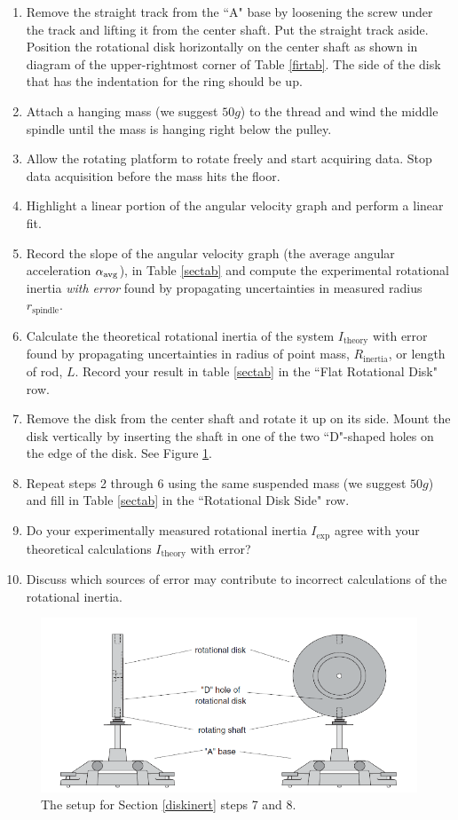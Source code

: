 \label{diskinert}
\begin{enumerate}
	\item Remove the straight track from the ``A" base by loosening the screw under the track and lifting it from the center shaft.  Put the straight track aside.  Position the rotational disk horizontally on the center shaft as shown in diagram of the upper-rightmost corner of Table \ref{firtab}.  The side of the disk that has the indentation for the ring should be up.
	\item Attach a hanging mass (we suggest $50g$) to the thread and wind the middle spindle until the mass is hanging right below the pulley.
	\item Allow the rotating platform to rotate freely and start acquiring data.  Stop data acquisition before the mass hits the floor.
	\item Highlight a linear portion of the angular velocity graph and perform a linear fit.
	\item Record the slope of the angular velocity graph (the average angular acceleration $\alpha _{\rm avg}$), in Table \ref{sectab} and compute the experimental rotational inertia {\it{with error}} found by propagating uncertainties in measured radius $r_\text{spindle}$.
\item Calculate the theoretical rotational inertia of the system $I_\text{theory}$ with error found by propagating uncertainties in radius of point mass, $R_\text{inertia}$, or length of rod, $L$. Record your result in table \ref{sectab} in the ``Flat Rotational Disk" row.
	\item Remove the disk from the center shaft and rotate it up on its side.  Mount the disk vertically by inserting the shaft in one of the two ``D"-shaped holes on the edge of the disk.  See Figure \ref{fig:rotinertias}.
\item Repeat steps 2 through 6 using the same suspended mass (we suggest $50g$) and fill in Table \ref{sectab} in the ``Rotational Disk Side" row.
\item Do your experimentally measured rotational inertia $I_\text{exp}$ agree with your theoretical calculations $I_\text{theory}$ with error?
\item Discuss which sources of error may contribute to incorrect calculations of the rotational inertia.
\end{enumerate}

\begin{figure}[!h]
	\begin{center}
		\includegraphics[width=0.8\linewidth]{./Exp1-7/pic/crazyfig.png}
	\end{center}
	\caption{The setup for Section \ref{diskinert} steps 7 and 8.}
	\label{fig:rotinertias}
\end{figure}

